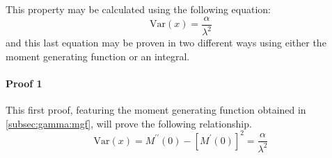 \documentclass[12pt]{article}
\begin{document}
This property may be calculated using the following equation:
\begin{equation}\label{eq:gamma:var}
	\text{Var}(x) = \frac{\alpha}{\lambda^2}
\end{equation}
and this last equation may be proven in two different ways using either the moment generating function or an integral.

\paragraph{Proof 1}
This first proof, featuring the moment generating function obtained in \autoref{subsec:gamma:mgf}, will prove the
following relationship.
\begin{equation}\label{eq:gamma:var:proof1}
	\text{Var}(x) = M^{\prime\prime}(0) - [M^\prime(0)]^2 = \frac{\alpha}{\lambda^2}
\end{equation}
\end{document}
